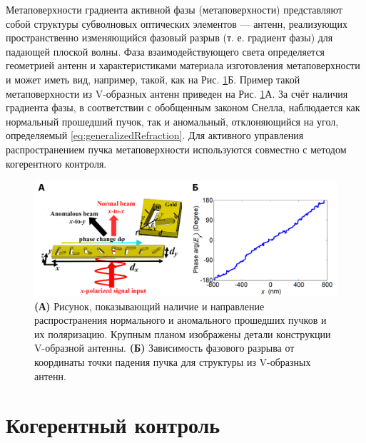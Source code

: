Метаповерхности градиента активной фазы (метаповерхности) представляют собой структуры субволновых оптических элементов --- антенн, реализующих пространственно изменяющийся фазовый разрыв (т. е. градиент фазы) для падающей плоской волны. Фаза взаимодействующего света определяется геометрией антенн и характеристиками материала изготовления метаповерхности и может иметь вид, например, такой, как на Рис. \ref{fig:metasurfaces}Б. Пример такой метаповерхности из V-образных антенн приведен на Рис. \ref{fig:metasurfaces}А. За счёт наличия градиента фазы, в соответствии с обобщенным законом Снелла, наблюдается как нормальный прошедший пучок, так и аномальный, отклоняющийся на угол, определяемый \eqref{eq:generalizedRefraction}. Для активного управления распространением пучка метаповерхности используются совместно с методом когерентного контроля.

\begin{figure}
    \includegraphics[width=\textwidth]{pictures/Metasurfaces.png}
    \caption{\textbf{(А)} Рисунок, показывающий наличие и направление распространения нормального и аномального прошедших пучков и их поляризацию. Крупным планом изображены детали конструкции V-образной антенны. \cite[Fig. 1A]{coherentControl2014} \textbf{(Б)} Зависимость фазового разрыва от координаты точки падения пучка для структуры из V-образных антенн.\cite[Fig. 1D]{coherentControl2014}}
    \label{fig:metasurfaces}
\end{figure}

\section{Когерентный контроль}

